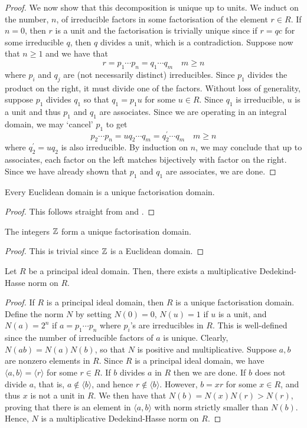 \begin{proof}
    We now show that this decomposition is unique up to units. We induct on the number, $n$, of irreducible factors in some factorisation of the element $r \in R$. If $n = 0$, then $r$ is a unit and the factorisation is trivially unique since if $r = qc$ for some irreducible $q$, then $q$ divides a unit, which is a contradiction. Suppose now that $n \geq 1$ and we have that
    \[
        r = p_1 \cdots p_n = q_1 \cdots q_m \quad m \geq n
    \]
    where $p_i$ and $q_j$ are (not necessarily distinct) irreducibles. Since $p_1$ divides the product on the right, it must divide one of the factors. Without loss of generality, suppose $p_1$ divides $q_1$ so that $q_1 = p_1 u$ for some $u \in R$. Since $q_1$ is irreducible, $u$ is a unit and thus $p_1$ and $q_1$ are associates. Since we are operating in an integral domain, we may `cancel' $p_1$ to get
    \[
        p_2 \cdots p_n = u q_2 \cdots q_m = q_2^{\prime} \cdots q_m \quad m \geq n
    \]
    where $q_2^{\prime} = uq_2$ is also irreducible. By induction on $n$, we may conclude that up to associates, each factor on the left matches bijectively with factor on the right. Since we have already shown that $p_1$ and $q_1$ are associates, we are done.
\end{proof}
\begin{cor} \label{cor:ED-is-UFD}
    Every Euclidean domain is a unique factorisation domain.
\end{cor}
\begin{proof}
    This follows straight from  and .
\end{proof}
\begin{cor} \label{cor:FTAr-UFD}
    The integers $\mathbb{Z}$ form a unique factorisation domain.
\end{cor}
\begin{proof}
    This is trivial since $\mathbb{Z}$ is a Euclidean domain.
\end{proof}

\begin{prop}
    Let $R$ be a principal ideal domain. Then, there exists a multiplicative Dedekind-Hasse norm on $R$.
\end{prop}
\begin{proof}
    If $R$ is a principal ideal domain, then $R$ is a unique factorisation domain. Define the norm $N$ by setting $N(0) = 0$, $N(u) = 1$ if $u$ is a unit, and $N(a) = 2^n$ if $a = p_1 \cdots p_n$ where $p_i$'s are irreducibles in $R$. This is well-defined since the number of irreducible factors of $a$ is unique. Clearly, $N(ab) = N(a)N(b)$, so that $N$ is positive and multiplicative. Suppose $a,b$ are nonzero elements in $R$. Since $R$ is a principal ideal domain, we have $\langle a,b \rangle = \langle r \rangle$ for some $r \in R$. If $b$ divides $a$ in $R$ then we are done. If $b$ does not divide $a$, that is, $a \notin \langle b \rangle$, and hence $r \notin \langle b \rangle$. However, $b = xr$ for some $x \in R$, and thus $x$ is not a unit in $R$. We then have that $N(b) = N(x)N(r) > N(r)$, proving that there is an element in $\langle a,b \rangle$ with norm strictly smaller than $N(b)$. Hence, $N$ is a multiplicative Dedekind-Hasse norm on $R$.
\end{proof}
